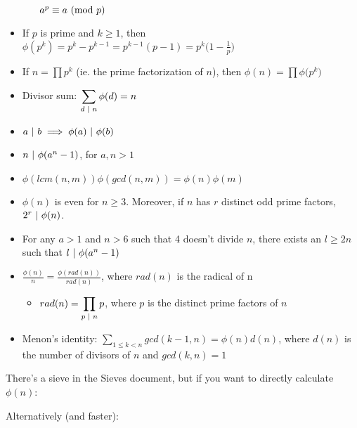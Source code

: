 \begin{itemize}
\begin{itemize}
        $a^p \equiv a \text{ } ( \text{mod } p )$
    \end{itemize}
    \item If $p$ is prime and $k \geq 1$, then
    $\phi (p^k) = p^k - p^{k-1} = p^{k-1} (p - 1) = p^k \big( 1 - \frac{1}{p} \big)$
    \item If ${\displaystyle n = \prod p^k }$ (ie. the prime factorization of $n$), then ${\displaystyle \phi (n) = \prod \phi \big( p^k \big) }$
    \item Divisor sum:
    ${\displaystyle \sum_{d \text{ } | \text{ } n} \phi(d) = n}$
    \item $a \text{ } | \text{ } b \implies \phi(a) \text{ } | \text{ } \phi(b)$
    \item $n \text{ } | \text{ } \phi(a^n - 1)$, for $a, n > 1$
    \item $\phi (lcm(n, m)) \phi( gcd(n, m)) = \phi (n) \phi (m)$
    \item $\phi (n)$ is even for $n \geq 3$. Moreover, if $n$ has $r$ distinct odd prime factors, $2^r \text{ } | \text{ } \phi(n)$.
    \item For any $a > 1$ and $n > 6$ such that 4 doesn't divide $n$, there exists an $l \geq 2n$ such that $l \text{ } | \text{ } \phi (a^n - 1)$
    \item $\frac{\phi (n)}{n} = \frac{\phi (rad(n))}{rad(n)}$, where $rad(n)$ is the radical of n
    \begin{itemize}
        \item ${\displaystyle rad(n) = \prod_{p \text{ } | \text{ } n} p}$, where $p$ is the distinct prime factors of $n$
    \end{itemize}
    \item Menon's identity: ${\displaystyle \sum_{1 \leq k < n} gcd(k-1, n) = \phi (n) d(n)}$, where $d(n)$ is the number of divisors of $n$ and $gcd(k,n) = 1$
\end{itemize}

There's a sieve in the Sieves document, but if you want to directly calculate $\phi (n)$:



Alternatively (and faster):



\newpage